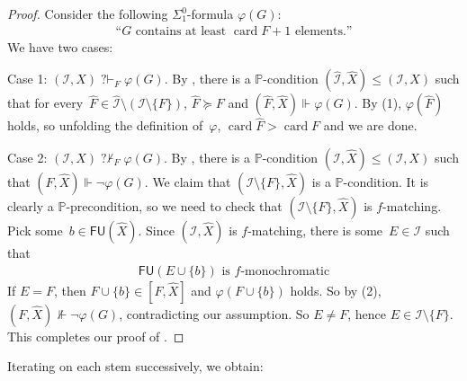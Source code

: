 \documentclass[10pt,a4paper]{article}
\def\PP{\mathbb{P}}
\def\I{\mathcal{I}}
\newcommand{\qvdash}{\operatorname{{?}{\vdash}}}
\newcommand{\nqvdash}{\operatorname{{?}{\nvdash}}}
\newcommand{\card}{\operatorname{card}}
\newcommand{\FU}[0]{\mathsf{FU}} %
\def\qt#1{``#1''}%
\def\h#1{\hat{#1}}
\numberwithin{theorem}{section}
\newtheorem{lemma}[theorem]{Lemma}
\begin{document}
\begin{proof}
Consider the following $\Sigma^0_1$-formula $\varphi(G)$:
\begin{align*}
\text{\qt{$G$ contains at least~$\card F + 1$ elements.}}
\end{align*}
We have two cases:
\smallskip

\noindent
Case 1: $(\I, X) \qvdash_F \varphi(G)$. By , there is a $\PP$-condition $(\h \I, \h X) \leq (\I, X)$ such that for every~$\h F \in \h \I \setminus (\I \setminus \{F\})$, $\h F \succeq F$ and $(\h F, \h X) \Vdash \varphi(G)$. By (1), $\varphi(\h F)$ holds, so unfolding the definition of~$\varphi$, $\card \h F > \card F$ and we are done.
\smallskip

\noindent
Case 2: $(\I, X) \nqvdash_F \varphi(G)$. By , there is a $\PP$-condition $(\I, \h X) \leq (\I, X)$ such that $(F, \h X) \Vdash \neg \varphi(G)$. We claim that $(\I \setminus \{F\}, \h X)$ is a $\PP$-condition.
It is clearly a $\PP$-precondition, so we need to check that $(\I \setminus \{F\}, \h X)$ is $f$-matching.
Pick some~$b \in \FU(\h X)$. Since $(\I, \h X)$ is $f$-matching, there is some~$E \in \I$ such that
\begin{align}
\text{$\FU(E \cup \{b\})$ is $f$-monochromatic}
\end{align}
If $E = F$, then $F \cup \{b\} \in [F, \h X]$ and $\varphi(F \cup \{b\})$ holds. So by (2), $(F, \h X) \not\Vdash \neg \varphi(G)$, contradicting our assumption. So $E \neq F$, hence $E \in \I \setminus \{F\}$.
This completes our proof of .
\end{proof}

Iterating  on each stem successively, we obtain:

\end{document}
